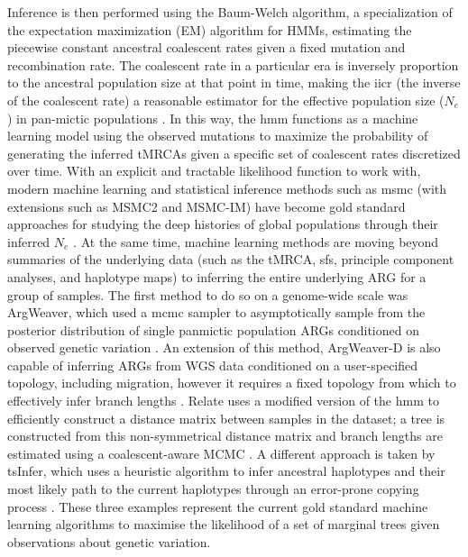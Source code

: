 Inference is then performed using the Baum-Welch algorithm, a specialization of the expectation maximization (EM) algorithm for HMMs, estimating the piecewise constant ancestral coalescent rates given a fixed mutation and recombination rate. The coalescent rate in a particular era is inversely proportion to the ancestral population size at that point in time, making the \gls{iicr} (the inverse of the coalescent rate) a reasonable estimator for the effective population size ($N_e$) in pan-mictic populations \cite{Chikhi2018}. In this way, the \gls{hmm} functions as a machine learning model using the observed mutations to maximize the probability of generating the inferred tMRCAs given a specific set of coalescent rates discretized over time. With an explicit and tractable likelihood function to work with, modern machine learning and statistical inference methods such as \gls{msmc} (with extensions such as MSMC2 and MSMC-IM) have become gold standard approaches for studying the deep histories of global populations through their inferred $N_e$ \cite{Wang2020,Fan2019b,Schiffels2014c}. At the same time, machine learning methods are moving beyond summaries of the underlying data (such as the tMRCA, \gls{sfs}, principle component analyses, and haplotype maps) to inferring the entire underlying ARG for a group of samples. The first method to do so on a genome-wide scale was ArgWeaver, which used a \gls{mcmc} sampler to asymptotically sample from the posterior distribution of single panmictic population ARGs conditioned on observed genetic variation \cite{Rasmussen2014a}. An extension of this method, ArgWeaver-D is also capable of inferring ARGs from WGS data conditioned on a user-specified topology, including migration, however it requires a fixed topology from which to effectively infer branch lengths \cite{Hubisz2020}. Relate uses a modified version of the \textcite{N2003} \gls{hmm} to efficiently construct a distance matrix between samples in the dataset; a tree is constructed from this non-symmetrical distance matrix and branch lengths are estimated using a coalescent-aware MCMC \cite{Speidel2019a}. A different approach is taken by tsInfer, which uses a heuristic algorithm to infer ancestral haplotypes and their most likely path to the current haplotypes through an error-prone copying process \cite{Kelleher2019a}. These three examples represent the current gold standard machine learning algorithms to maximise the likelihood of a set of marginal trees given observations about genetic variation.

